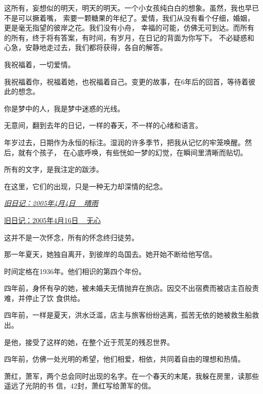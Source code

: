 		这所有，妄想似的明天，明天的明天。一个小女孩纯白白的想象。虽然，我也早已不是可以撅着嘴，
	索要一颗糖果的年纪了。爱情，我们从没有看个仔细，婚姻，更是毫无指望的彼岸之花。我们没有小舟，
	幸福的可能，仿佛无可到达。而所有的所有，终于将有答案，有时间，有岁月，在日记的背面为你写下。
	不必疑惑和心急，安静地走过去，我们都将获得，各自的解答。

		我祝福着，一切爱情。

		我祝福着你，祝福着她，也祝福着自己。变更的故事，在6年后的回首，等待着彼此的想念。

		你是梦中的人，我是梦中迷惑的光线。

	\endwriting



		无意间，翻到去年的日记，一样的春天，不一样的心绪和语言。

		年岁过去，日期作为永恒的标注。湿润的许多季节，把我从记忆的牢笼唤醒。然后，就有个孩子，
	在心底呼唤，有些恍如一梦的幻觉，在瞬间里清晰而贴切。

		所有的文字，是我注定的跋涉。

		在这里，它们的出现，只是一种无力却深情的纪念。

		{ \small \slshape
			\hspace{2em}\hyperref[diary_20050404]{旧日记：2005年4月4日 ~ 晴雨}

			\hspace{2em}\hyperref[diary_20050416]{旧日记：2005年4月16日 ~ 无心}
		}

		这并不是一次怀念，所有的怀念终归徒劳。

	\endwriting



		那一年夏天，她独自离开，到彼岸的岛国去。她开始不断给他写信。

		时间定格在1936年。他们相识的第四个年份。

		四年前，身怀有孕的她，被未婚夫无情抛弃在旅店。因交不出宿费而被店主百般责难，并停止了饮
	食供给。

		四年前，一样是夏天，洪水泛滥，店主与旅客纷纷逃离，孤苦无依的她被救生船救出。

		是他，接受了这样的她，在整个近于荒芜的残忍世界。

		四年前，仿佛一处光明的希望，他们相爱，相依，共同着自由的理想和热情。

		萧红，萧军，两个总会同时出现的名字。在一个春天的末尾，我躲在房里，读那些遥远了光阴的书
	信，42封，萧红写给萧军的信。

